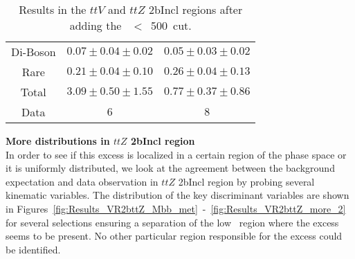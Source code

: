 \begin{table}
{{\begin{tabular}{|c|cc|}
        Di-Boson & $0.07 \pm 0.04 \pm 0.02$ & $0.05 \pm 0.03 \pm 0.02$ \\
           Rare & $0.21 \pm 0.04 \pm 0.10$ & $0.26 \pm 0.04 \pm 0.13$ \\\hline
          Total & $3.09 \pm 0.50 \pm 1.55$ & $0.77 \pm 0.37 \pm 0.86$ \\
           Data & $6 $ & $8 $\\\hline\hline
\end{tabular}}
\caption{Results in the $ttV$ and $ttZ$ 2bIncl regions after adding the \meff~$<$~500~\GeV cut.}
\label{Tab:ttV_ttZ_meffCutChanged_2}
}
\end{table}

\par{\bf More distributions in $ttZ$ 2bIncl region\\}
In order to see if this excess is localized in a certain region of the phase space or it is uniformly distributed, we look at the agreement between the background expectation and data observation in $ttZ$ 2bIncl region by probing several kinematic variables. The distribution of the key discriminant variables are shown in Figures~\ref{fig:Results_VR2bttZ_Mbb_met}~-~\ref{fig:Results_VR2bttZ_more_2} for several selections ensuring a separation of the low \meff\ region where the excess seems to be present. No other particular region responsible for the excess could be identified.

